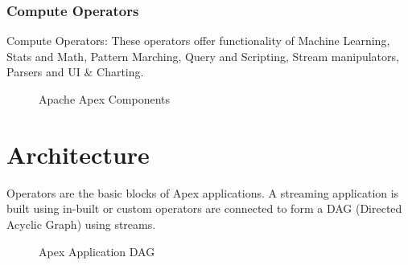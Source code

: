 \documentclass[9pt,twocolumn,twoside]{../../styles/osajnl}
\begin{document}
\subsubsection{Compute Operators}
Compute Operators: These operators offer functionality of Machine Learning, Stats and Math, Pattern Marching, Query and Scripting, Stream manipulators, Parsers and UI \& Charting.
\begin{figure}[ht!]
\centering
{}
\caption{Apache Apex Components \cite{www-apacheapexblog}}
\label{fig:Apache Apex Components}
\end{figure}




\section{Architecture}

Operators are the basic blocks of Apex applications. A streaming application is built using in-built or custom operators are connected to form a DAG (Directed Acyclic Graph) using streams. 
\begin{figure}[ht!]
\centering
{}
\caption{Apex Application DAG \cite{www-apacheapexappdevdoc}}
\label{fig:Apex Application DAG}
\end{figure}
\end{document}
